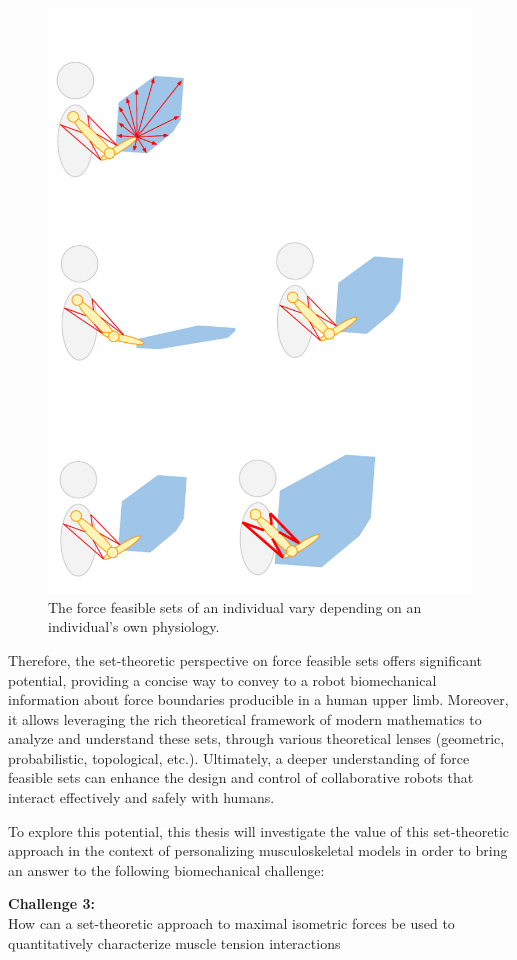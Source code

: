 \begin{figure}[!htb]
    \captionsetup{justification=centering}
        \centering
        \includegraphics[trim={0 10 40 400},clip,width=0.7\linewidth]{img/chapter_1/ffs_characteristics.pdf}
    \caption{The force feasible sets of an individual vary depending on an individual's own physiology.}
    \label{fig:ffs_individual}
\end{figure}


Therefore, the set-theoretic perspective on force feasible sets offers significant potential, providing a concise way to convey to a robot biomechanical information about force boundaries producible in a human upper limb. Moreover, it allows leveraging the rich theoretical framework of modern mathematics to analyze and understand these sets, through various theoretical lenses (geometric, probabilistic, topological, etc.). Ultimately, a deeper understanding of force feasible sets can enhance the design and control of collaborative robots that interact effectively and safely with humans.

To explore this potential, this thesis will investigate the value of this set-theoretic approach in the context of personalizing musculoskeletal models in order to bring an answer to the following biomechanical challenge:

\begin{mdframed}
    \begin{center}
        \textbf{Challenge 3:} \\
        How can a set-theoretic approach to maximal isometric forces be used to quantitatively characterize muscle tension interactions
    \end{center}
\end{mdframed}

